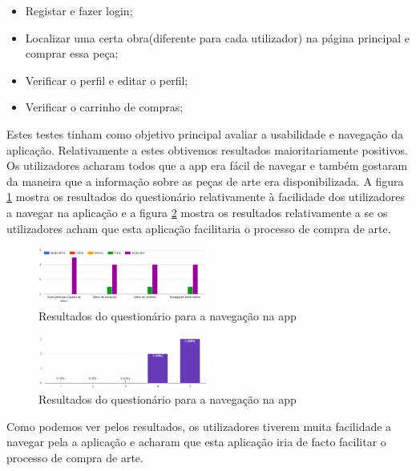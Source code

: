 \documentclass[conference]{IEEEtran}
\begin{document}
\begin{itemize}
    \item Registar e fazer login;
    \item Localizar uma certa obra(diferente para cada utilizador) na página principal e comprar essa peça;
    \item Verificar o perfil e editar o perfil;
    \item Verificar o carrinho de compras;
\end{itemize}

Estes testes tinham como objetivo principal avaliar a usabilidade e navegação da aplicação. Relativamente a estes obtivemos resultados maioritariamente positivos. Os utilizadores acharam todos que a app era fácil de navegar e também gostaram da maneira que a informação sobre as peças de arte era disponibilizada. A figura
\ref{fig:navegacaoTest}
mostra os resultados do questionário relativamente à facilidade dos utilizadores a navegar na aplicação e a figura
\ref{fig:facilitaTest}
mostra os resultados relativamente a se os utilizadores acham que esta aplicação facilitaria o processo de compra de arte.

\begin{figure}[ht]
    \centering
    \includegraphics[width=0.5\textwidth]{questionarioNavegacao.png}
    \caption{Resultados do questionário para a navegação na app}
    \label{fig:navegacaoTest}
\end{figure}

\begin{figure}[ht]
    \centering
    \includegraphics[width=0.5\textwidth]{questionarioFacilitar.png}
    \caption{Resultados do questionário para a navegação na app}
    \label{fig:facilitaTest}
\end{figure}

Como podemos ver pelos resultados, os utilizadores tiverem muita facilidade a navegar pela a aplicação e acharam que esta aplicação iria de facto facilitar o processo de compra de arte.
\end{document}
